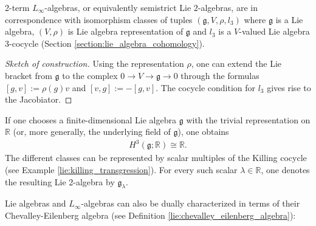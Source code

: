     \begin{property}
        2-term $L_\infty$-algebras, or equivalently semistrict Lie $2$-algebras, are in correspondence with isomorphism classes of tuples $(\mathfrak{g},V,\rho,l_3)$ where $\mathfrak{g}$ is a Lie algebra, $(V,\rho)$ is Lie algebra representation of $\mathfrak{g}$ and $l_3$ is a $V$-valued Lie algebra 3-cocycle (Section \ref{section:lie_algebra_cohomology}).
        \begin{mdframed}[roundcorner=10pt, linecolor=blue, linewidth=1pt]
            \begin{proof}[Sketch of construction]
                Using the representation $\rho$, one can extend the Lie bracket from $\mathfrak{g}$ to the complex $0\rightarrow V\rightarrow\mathfrak{g}\rightarrow0$ through the formulas $[g,v]:=\rho(g)v$ and $[v,g] := -[g,v]$. The cocycle condition for $l_3$ gives rise to the Jacobiator.
            \end{proof}
        \end{mdframed}
    \end{property}
    \begin{example}\label{hda:gk_lie_2_algebra}
        If one chooses a finite-dimensional Lie algebra $\mathfrak{g}$ with the trivial representation on $\mathbb{R}$ (or, more generally, the underlying field of $\mathfrak{g}$), one obtains
        \begin{gather}
            H^3(\mathfrak{g};\mathbb{R})\cong\mathbb{R}.
        \end{gather}
        The different classes can be represented by scalar multiples of the Killing cocycle (see Example \ref{lie:killing_transgression}). For every such scalar $\lambda\in\mathbb{R}$, one denotes the resulting Lie 2-algebra by $\mathfrak{g}_\lambda$.
    \end{example}

    Lie algebras and $L_\infty$-algebras can also be dually characterized in terms of their Chevalley-Eilenberg algebra (see Definition \ref{lie:chevalley_eilenberg_algebra}):

